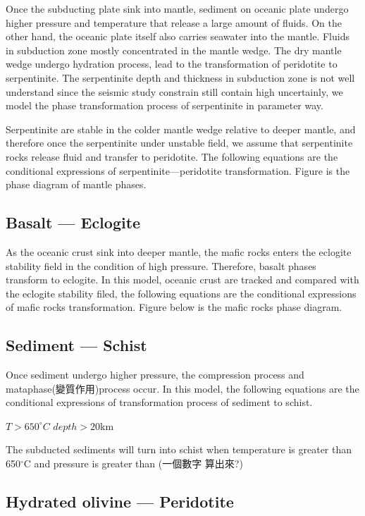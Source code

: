 Once the subducting plate sink into mantle, sediment on oceanic plate undergo higher pressure and temperature that release a large amount of fluids. 
On the other hand, the oceanic plate itself also carries seawater into the mantle. 
Fluids in subduction zone mostly concentrated in the mantle wedge. 
The dry mantle wedge undergo hydration process, lead to the transformation of peridotite to serpentinite.  
The serpentinite depth and thickness in subduction zone is not well understand since the seismic study constrain still contain high uncertainly, we model the phase transformation process of serpentinite in parameter way.     

Serpentinite are stable in the colder mantle wedge relative to deeper mantle, and therefore once the serpentinite under unstable field, we assume that serpentinite rocks release fluid and transfer to peridotite. 
The following equations are the conditional expressions of serpentinite---peridotite transformation. Figure is the phase diagram of mantle phases.


\subsection{Basalt --- Eclogite}

As the oceanic crust sink into deeper mantle, the mafic rocks enters the eclogite stability field in the condition of high pressure. 
Therefore, basalt phases transform to eclogite.  
In this model, oceanic crust are tracked and compared with the eclogite stability filed, the following equations are the conditional expressions of mafic rocks transformation. 
Figure below is the mafic rocks phase diagram.

\subsection{Sediment --- Schist}

Once sediment undergo higher pressure, the compression process and mataphase(變質作用)process occur.
In this model, the following equations are the conditional expressions of transformation process of sediment to schist.

$T > 650^{\circ} C$
$depth >  20 $km 

The subducted sediments will turn into schist when temperature is greater than 650$^\circ$C and pressure is greater than (一個數字 算出來?)

\subsection{Hydrated olivine --- Peridotite}

